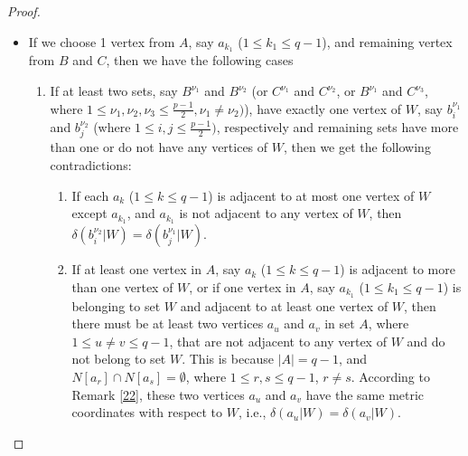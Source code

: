 \documentclass[]{interact}
\theoremstyle{plain}%
\theoremstyle{definition}
\theoremstyle{remark}
\begin{document}
\begin{proof}
\begin{enumerate}
\begin{itemize}
\begin{enumerate}
\begin{enumerate}
 $\delta(a_{u}|W) =\delta(a_{v}|W)$.
    \end{enumerate}
    \item \label{item 9} If only one set, say \( B^{\nu_1} \) (or \( C^{\nu_2} \)), where \( 1 \leq \nu_1, \nu_2 \leq \frac{p-1}{2} \), contains one vertex of  \( W \), say \( b^{\nu_1}_i \), while the remaining sets contain either more than one or do not have any vertices of  \( W \), then there exist at least two sets do not contain any vertex of $W$, which we will denote by $B^{\nu_3}$ and $B^{\nu_4}$ (where $\nu_3 \neq \nu_4$). This is because $W$ has $q-2$ vertices, and $q-2<2p-4$, and also 2 vertices of $W$ are chosen in $A$. Therefore, From Remark \ref{last} $\delta(q_i|W) = \delta(q_j|W)$, where $q_i$ and $q_j$ are adjacent to vertices of $B^{\nu_3}$ and $B^{\nu_4}$ respectively.
 \item If all sets $B^{\nu_i}$ and $C^{\nu_j}$ (where $1\leq i,j \leq \frac{p-1}{2})$ either contain more than one vertex of $W$ or do not contain any vertex of $W$, then we arrive at the same contradiction mentioned in the previous case \ref{item 9}. 
   \end{enumerate} 
    \item If we choose 1 vertex from $A$, say $a_{k_1}$ ($1\leq k_1 \leq q-1$), and remaining vertex from $B$ and $C$, then we have the following cases
    \begin{enumerate}
        \item If at least two sets, say $B^{\nu_1}$ and $B^{\nu_2}$ (or $C^{\nu_1}$ and $C^{\nu_2}$, or $B^{\nu_1}$ and $C^{\nu_3}$, where $1\leq \nu_1,\nu_2,\nu_3 \leq \frac{p-1}{2}, \nu_1\neq \nu_2)$), have exactly one vertex of $W$, say $b^{\nu_1}_i$ and $b^{\nu_2}_j$ (where $1\leq i,j \leq \frac{p-1}{2})$, respectively and remaining sets have more than one or do not have any vertices of $W$, then we get the following contradictions:
         \begin{enumerate}
        \item If each $a_k$ ($1\leq k \leq q-1$) is adjacent to at most one vertex of $W$ except $a_{k_1}$, and $a_{k_1}$ is not adjacent to any vertex of $W$, then $\delta( b^{\nu_2}_i|W) =\delta( b^{\nu_1}_{j}|W)$.
        \item If at least one vertex in $A$, say $a_k$ ($1\leq k \leq q-1$) is adjacent to more than one vertex of $W$, or if one vertex in $A$, say $a_{k_1}$ ($1\leq k_1 \leq q-1$) is belonging to set $W$ and adjacent to at least one vertex of $W$, then there must be at least two vertices $a_u$ and $a_v$ in set $A$, where $1 \leq u \neq v \leq q-1$, that are not adjacent to any vertex of $W$ and do not belong to set $W$. This is because $|A|=q-1$, and $N[a_r]\cap N[a_s]=\emptyset$, where $1\leq r,s\leq q-1$, $r\neq s$. According to Remark \ref{22}, these two vertices $a_u$ and $a_v$ have the same metric coordinates with respect to $W$, i.e., $\delta(a_u|W) = \delta(a_v|W)$.

\end{enumerate}
\end{enumerate}
\end{itemize}
\end{enumerate}
\end{proof}
\end{document}
